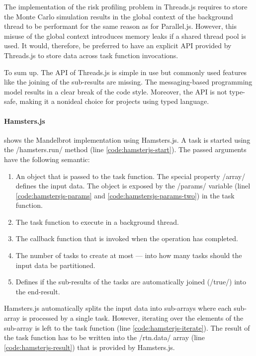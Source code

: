 The implementation of the risk profiling problem in Threads.js requires to store the Monte Carlo simulation results in the global context of the background thread to be performant for the same reason as for Parallel.js. However, this misuse of the global context introduces memory leaks if a shared thread pool is used. It would, therefore, be preferred to have an explicit API provided by Threads.js to store data across task function invocations.

To sum up. The API of Threads.js is simple in use but commonly used features like the joining of the sub-results are missing. The messaging-based programming model results in a clear break of the code style. Moreover, the API is not type-safe, making it a nonideal choice for projects using typed language.

\paragraph{Hamsters.js}
 shows the Mandelbrot implementation using Hamsters.js. A task is started using the \javascriptinline/hamsters.run/ method (line \ref{code:hamsterjs-start}). The passed arguments have the following semantic:

\begin{enumerate}
	\item An object that is passed to the task function. The special property \javascriptinline/array/ defines the input data. The object is exposed by the \javascriptinline/params/ variable (linel \ref{code:hamstersjs-params} and \ref{code:hamstersjs-params-two}) in the task function.
	\item The task function to execute in a background thread.
	\item The callback function that is invoked when the operation has completed.
	\item The number of tasks to create at most --- into how many tasks should the input data be partitioned. 
	\item Defines if the sub-results of the tasks are automatically joined (\javascriptinline/true/) into the end-result.
\end{enumerate}

Hamsters.js automatically splits the input data into sub-arrays where each sub-array is processed by a single task. However, iterating over the elements of the sub-array is left to the task function (line \ref{code:hamsterjs-iterate}). The result of the task function has to be written into the \javascriptinline/rtn.data/ array (line \ref{code:hamsterjs-result}) that is provided by Hamsters.js. 

